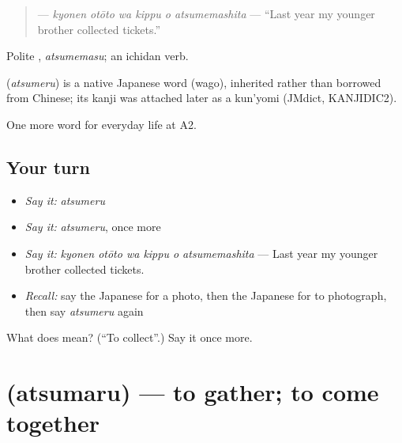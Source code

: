 \begin{quote}
\textbf{   } — \emph{kyonen otōto wa kippu o atsumemashita} — \textquotedblleft{}Last year my younger brother collected tickets.\textquotedblright{}
\end{quote}

Polite \textbf{}, \emph{atsumemasu}; an ichidan verb.

\begin{cousinweb}
\textbf{} (\emph{atsumeru}) is a native Japanese word (wago), inherited rather than borrowed from Chinese; its kanji was attached later as a kun'yomi (JMdict, KANJIDIC2).
\end{cousinweb}

\begin{grammarlens}[title={What you've built}]
One more word for everyday life at A2.
\end{grammarlens}

\subsection*{Your turn}
\begin{itemize}
\raggedright
  \item \emph{Say it:} \emph{atsumeru}
  \item \emph{Say it:} \emph{atsumeru}, once more
  \item \emph{Say it:} \emph{kyonen otōto wa kippu o atsumemashita} — Last year my younger brother collected tickets.
  \item \emph{Recall:} say the Japanese for a photo, then the Japanese for to photograph, then say \emph{atsumeru} again
\end{itemize}

\begin{tcolorbox}[breakable,colback=teal!4,colframe=teal!35!black,title={Before you move on}]
What does  mean? (\textquotedblleft{}To collect\textquotedblright{}.) Say it once more.
\end{tcolorbox}
\section[\texorpdfstring{\ja{あつまる} (atsumaru)}{あつまる (atsumaru)}]{ (atsumaru) — to gather; to come together}

\label{lesson:JA-C237-atsumaru}



